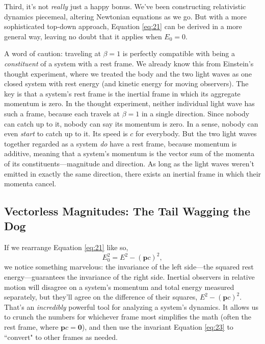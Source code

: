 \documentclass[12pt]{article}
\renewcommand{\vv}[1]{\mathbf{#1}}
\begin{document}
Third, it's not \emph{really} just a happy bonus. We've been constructing relativistic dynamics piecemeal, altering Newtonian equations as we go. But with a more sophisticated top-down approach, Equation \ref{eq:21} can be derived in a more general way, leaving no doubt that it applies when $E_0 = 0$.

A word of caution: traveling at $\beta = 1$ is perfectly compatible with being a \emph{constituent} of a system with a rest frame. We already know this from Einstein's thought experiment, where we treated the body and the two light waves as one closed system with rest energy (and kinetic energy for moving observers). The key is that a system's rest frame is the inertial frame in which its aggregate momentum is zero. In the thought experiment, neither individual light wave has such a frame, because each travels at $\beta = 1$ in a single direction. Since nobody can catch up to it, nobody can say its momentum is zero. In a sense, nobody can even \emph{start} to catch up to it. Its speed is $c$ for everybody. But the two light waves together regarded as a system \emph{do} have a rest frame, because momentum is additive, meaning that a system's momentum is the vector sum of the momenta of its constituents---magnitude and direction. As long as the light waves weren't emitted in exactly the same direction, there exists an inertial frame in which their momenta cancel.



\subsection{Vectorless Magnitudes: The Tail Wagging the Dog}

If we rearrange Equation \ref{eq:21} like so,
\begin{equation}\label{eq:23}
E_0^2=E^2-(\vv p c)^2,
\end{equation}
we notice something marvelous: the invariance of the left side---the squared rest energy---guarantees the invariance of the right side. Inertial observers in relative motion will disagree on a system's momentum and total energy measured separately, but they'll agree on the difference of their squares, $E^2-(\vv p c)^2$. That's an \emph{incredibly} powerful tool for analyzing a system's dynamics. It allows us to crunch the numbers for whichever frame most simplifies the math (often the rest frame, where $\vv p c = \vv 0$), and then use the invariant Equation \ref{eq:23} to ``convert" to other frames as needed.
\end{document}
